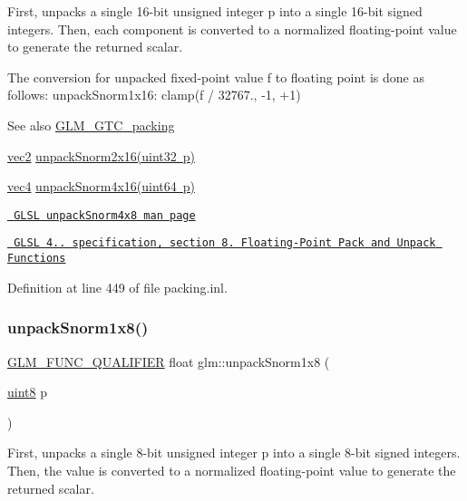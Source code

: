First, unpacks a single 16-\/bit unsigned integer p into a single 16-\/bit signed integers. Then, each component is converted to a normalized floating-\/point value to generate the returned scalar.

The conversion for unpacked fixed-\/point value f to floating point is done as follows\+: unpack\+Snorm1x16\+: clamp(f / 32767., -\/1, +1)

\begin{DoxySeeAlso}{See also}
\mbox{\hyperlink{group__gtc__packing}{G\+L\+M\+\_\+\+G\+T\+C\+\_\+packing}} 

\mbox{\hyperlink{group__core__types_gaa1618f51db67eaa145db101d8c8431d8}{vec2}} \mbox{\hyperlink{group__core__func__packing_gae5f30f599243df9525315edecae09a7f}{unpack\+Snorm2x16(uint32 p)}} 

\mbox{\hyperlink{group__core__types_ga5881b1b022d7fd1b7218f5916532dd02}{vec4}} \mbox{\hyperlink{group__gtc__packing_ga1bfaa3f217fd7a4b6b9d3117ecb3fcac}{unpack\+Snorm4x16(uint64 p)}} 

\href{http://www.opengl.org/sdk/docs/manglsl/xhtml/unpackSnorm1x16.xml}{\texttt{ G\+L\+SL unpack\+Snorm4x8 man page}} 

\href{http://www.opengl.org/registry/doc/GLSLangSpec.4.20.8.pdf}{\texttt{ G\+L\+SL 4.. specification, section 8. Floating-\/\+Point Pack and Unpack Functions}} 
\end{DoxySeeAlso}


Definition at line 449 of file packing.\+inl.

\mbox{\label{group__gtc__packing_ga6f2bebf536fbf7c8b97d4b306bb3354e}} 
\subsubsection{\texorpdfstring{unpackSnorm1x8()}{unpackSnorm1x8()}}
{\footnotesize\ttfamily \mbox{\hyperlink{setup_8hpp_a33fdea6f91c5f834105f7415e2a64407}{G\+L\+M\+\_\+\+F\+U\+N\+C\+\_\+\+Q\+U\+A\+L\+I\+F\+I\+ER}} float glm\+::unpack\+Snorm1x8 (\begin{DoxyParamCaption}\item[{\mbox{\hyperlink{group__gtc__type__precision_ga1a7dcd8aac97cc8020817c94049deff2}{uint8}}}]{p }\end{DoxyParamCaption})}

First, unpacks a single 8-\/bit unsigned integer p into a single 8-\/bit signed integers. Then, the value is converted to a normalized floating-\/point value to generate the returned scalar.

